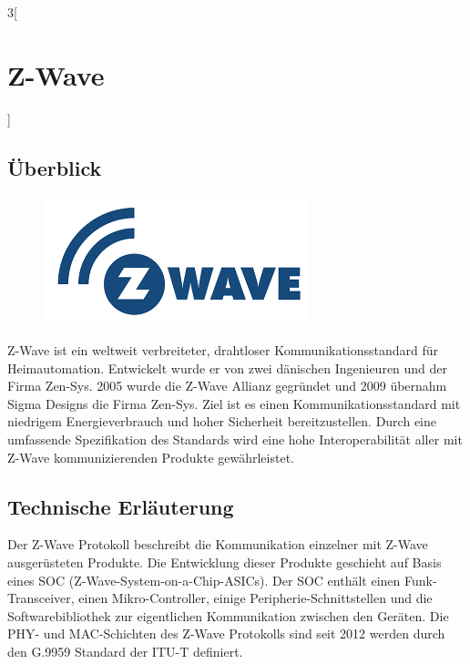\begin{multicols}{3}[\section{Z-Wave}]
\subsection*{Überblick}
\begin{figure}
  \vspace{-20pt}
  \begin{center}
  	\hspace{-20pt}
    \includegraphics[width=1\linewidth]{Kapitel/Z-Wave/Grafiken/logo.jpg}
  \end{center}
  \vspace{-15pt}
\end{figure}
Z-Wave ist ein weltweit verbreiteter, drahtloser Kommunikationsstandard für Heimautomation. Entwickelt wurde er von zwei dänischen Ingenieuren und der Firma Zen-Sys. 2005 wurde die Z-Wave Allianz gegründet und 2009 übernahm Sigma Designs die Firma Zen-Sys. Ziel ist es einen Kommunikationsstandard mit niedrigem Energieverbrauch und hoher Sicherheit bereitzustellen. Durch eine umfassende Spezifikation des Standards wird eine hohe Interoperabilität aller mit Z-Wave kommunizierenden Produkte gewährleistet.

\subsection*{Technische Erläuterung}
Der Z-Wave Protokoll beschreibt die Kommunikation einzelner mit Z-Wave ausgerüsteten Produkte.
Die Entwicklung dieser Produkte geschieht auf Basis eines SOC (Z-Wave-System-on-a-Chip-ASICs). Der SOC enthält einen Funk-Transceiver, einen Mikro-Controller, einige Peripherie-Schnittstellen und die Softwarebibliothek zur eigentlichen Kommunikation zwischen den Geräten. Die PHY- und MAC-Schichten des Z-Wave Protokolls sind seit 2012 werden durch den G.9959 Standard der ITU-T definiert. 


\end{multicols}
